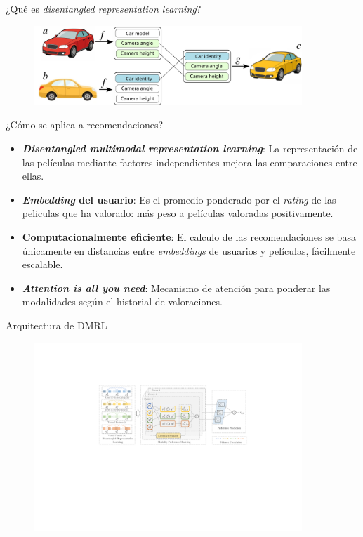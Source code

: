 \documentclass{beamer}
\begin{document}
\begin{frame}{¿Qué es \textit{disentangled representation learning}?}

    \begin{figure}
        \centering
        \includegraphics[width=0.9\textwidth]{images/disentangled-representation-learning.png}
    \end{figure}

\end{frame}

\begin{frame}{¿Cómo se aplica a recomendaciones?}
\pause
\begin{itemize}
    \item \textbf{\textit{Disentangled multimodal representation learning}}: La representación de las películas mediante factores independientes mejora las comparaciones entre ellas.
    \pause
    \item \textbf{\textit{Embedding} del usuario}: Es el promedio ponderado  por el \textit{rating} de las peliculas que ha valorado: más peso a películas valoradas positivamente.
    \pause
    \item \textbf{Computacionalmente eficiente}: El calculo de las recomendaciones se basa únicamente en distancias entre \textit{embeddings} de usuarios y películas, fácilmente escalable.
    \pause
    \item \textbf{\textit{Attention is all you need}}: Mecanismo de atención para ponderar las modalidades según el historial de valoraciones.
\end{itemize}
\end{frame}

\begin{frame}{Arquitectura de DMRL}
    \begin{figure}
        \centering
        \includegraphics[width=0.9\textwidth]{images/dmrl_arch.pdf}
    \end{figure}
\end{frame}
\end{document}
